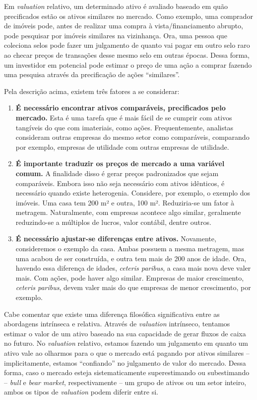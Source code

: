 \documentclass[aprovado,numbers]{coppe}
\providecommand{\tightlist}{%
  \setlength{\itemsep}{0pt}\setlength{\parskip}{0pt}}
\begin{document}
  Em \emph{valuation} relativo, um determinado ativo é avaliado baseado em quão precificados estão os ativos similares no mercado. Como exemplo, uma comprador de imóveis pode, antes de realizar uma compra à vista/financiamento abrupto, pode pesquisar por imóveis similares na vizinhança. Ora, uma pessoa que coleciona selos pode fazer um julgamento de quanto vai pagar em outro selo raro ao checar preços de transações desse mesmo selo em outras épocas. Dessa forma, um investidor em potencial pode estimar o preço de uma ação a comprar fazendo uma pesquisa através da precificação de ações ``similares''.

  Pela descrição acima, existem três fatores a se considerar:
  \begin{enumerate}
  \def\labelenumi{\arabic{enumi}.}
  \tightlist
  \item
    \textbf{É necessário encontrar ativos comparáveis, precificados pelo mercado.} Esta é uma tarefa que é mais fácil de se cumprir com ativos tangíveis do que com imateriais, como ações. Frequentemente, analistas consideram outras empresas do mesmo setor como comparáveis, comparando por exemplo, empresas de utilidade com outras empresas de utilidade.
  \item
    \textbf{É importante traduzir os preços de mercado a uma variável comum.} A finalidade disso é gerar preços padronizados que sejam comparáveis. Embora isso não seja necessário com ativos idênticos, é necessário quando existe heterogenia. Considere, por exemplo, o exemplo dos imóveis. Uma casa tem 200 m² e outra, 100 m². Reduziria-se um fator à metragem. Naturalmente, com empresas acontece algo similar, geralmente reduzindo-se a múltiplos de lucros, valor contábil, dentre outros.
  \item
    \textbf{É necessário ajustar-se diferenças entre ativos.} Novamente, consideremos o exemplo da casa. Ambas possuem a mesma metragem, mas uma acabou de ser construída, e outra tem mais de 200 anos de idade. Ora, havendo essa diferença de idades, \emph{ceteris paribus}, a casa mais nova deve valer mais. Com ações, pode haver algo similar. Empresas de maior crescimento, \emph{ceteris paribus}, devem valer mais do que empresas de menor crescimento, por exemplo.
  \end{enumerate}
  Cabe comentar que existe uma diferença filosófica significativa entre as abordagens intrínseca e relativa. Através de \emph{valuation} intrínseco, tentamos estimar o valor de um ativo baseado na sua capacidade de gerar fluxos de caixa no futuro. No \emph{valuation} relativo, estamos fazendo um julgamento em quanto um ativo vale ao olharmos para o que o mercado está pagando por ativos similares -- implicitamente, estamos ``confiando'' no julgamento de valor do mercado. Dessa forma, caso o mercado esteja sistematicamente superestimando ou subestimando -- \emph{bull} e \emph{bear market}, respectivamente -- um grupo de ativos ou um setor inteiro, ambos os tipos de \emph{valuation} podem diferir entre si.
\end{document}
